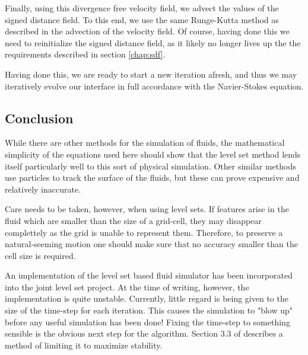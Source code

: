 Finally, using this divergence free velocity field, we advect the values of the signed distance field. To this end, we use the same Runge-Kutta method as described in the advection of the velocity field. Of course, having done this we need to reinitialize the signed distance field, as it likely no longer lives up the the requirements described in section \vref{chap:sdf}.

Having done this, we are ready to start a new iteration afresh, and thus we may iteratively evolve our interface in full accordance with the Navier-Stokes equation.

\subsection{Conclusion}
While there are other methods for the simulation of fluids, the mathematical simplicity of the equations used here should show that the level set method lends itself particularly well to this sort of physical simulation. Other similar methods use particles to track the surface of the fluids, but these can prove expensive and relatively inaccurate.

Care needs to be taken, however, when using level sets. If features arise in the fluid which are smaller than the size of a grid-cell, they may disappear complettely as the grid is unable to represent them. Therefore, to preserve a natural-seeming motion one should make sure that no accuracy smaller than the cell size is required.

An implementation of the level set based fluid simulator has been incorporated into the joint level set project. At the time of writing, however, the implementation is quite unstable. Currently, little regard is being given to the size of the time-step for each iteration. This causes the simulation to "blow up" before any useful simulation has been done! Fixing the time-step to something sensible is the obvious next step for the algorithm. Section 3.3 of  describes a method of limiting it to maximize stability.